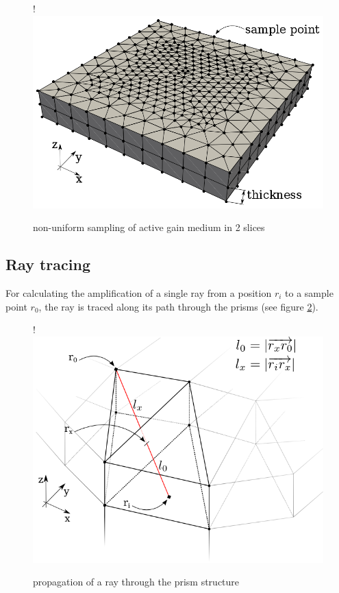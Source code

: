\begin{figure}
  \centerline{
     {!} {\includegraphics{graphics/samples_reduced.png}}
  }
  \caption{non-uniform sampling of active gain medium in 2 slices}
  \label{graphic:samples_reduced}
\end{figure}




\subsection{Ray tracing}
\label{subsec:raytracing}

For calculating the amplification of a single ray from a position $r_i$ to a sample
point $r_0$, the ray is traced along its path through the prisms (see figure
\ref{graphic:prism_propagation}). 

\begin{figure}[H]
  \centerline{
     {!} {\includegraphics{./graphics/prism_propagation_3.png}}
  }
  \caption{propagation of a ray through the prism structure}
  \label{graphic:prism_propagation}
\end{figure}

